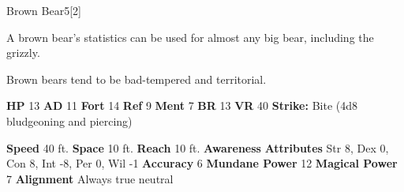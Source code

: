   \begin{monsubsection}{Brown Bear}{5}[2]
    \vspace{-1em}\vspace{-1em}
    \vspace{0em}

    
          A brown bear's statistics can be used for almost any big bear, including the grizzly.
        
            Brown bears tend to be bad-tempered and territorial.
          

    \begin{spellcontent}
      \begin{spelltargetinginfo}
        \pari \textbf{HP} 13 \monsep
          \textbf{AD} 11 \monsep
          \textbf{Fort} 14 \monsep
          \textbf{Ref} 9 \monsep
          \textbf{Ment} 7
        \pari \textbf{BR} 13 \monsep
        \textbf{VR} 40
        \pari \textbf{Strike:}
            Bite  (4d8 bludgeoning and piercing)
      \end{spelltargetinginfo}
    \end{spellcontent}
    \begin{monsterfooter}
      \pari \textbf{Speed} 40 ft. \monsep
        \textbf{Space} 10 ft. \monsep
        \textbf{Reach} 10 ft.
      \pari \textbf{Awareness} 
      \pari \textbf{Attributes}
        Str 8, Dex 0,
        Con 8, Int -8,
        Per 0, Wil -1
      \pari \textbf{Accuracy} 6 \monsep
        \textbf{Mundane Power} 12 \monsep
      \textbf{Magical Power} 7
      \pari \textbf{Alignment} Always true neutral
    \end{monsterfooter}
  \end{monsubsection}
  
  
  
